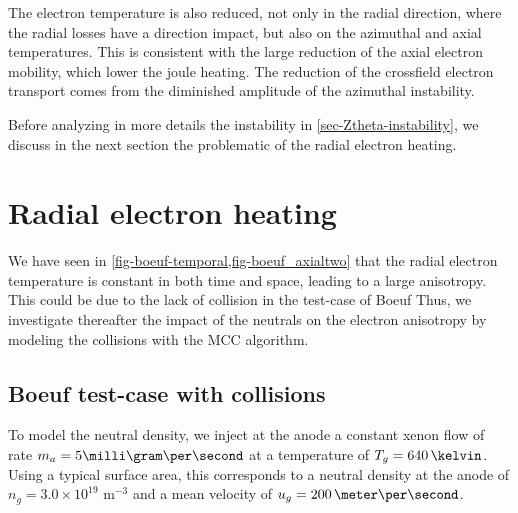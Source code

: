   The electron temperature is also reduced, not only in the radial direction, where the radial losses have a direction impact, but also on the azimuthal and axial temperatures.
  This is consistent with the large reduction of the axial electron mobility, which lower the joule heating.
  The reduction of the crossfield electron transport comes from the diminished amplitude of the azimuthal instability.
  
  Before analyzing in more details the instability in \cref{sec-Ztheta-instability}, we discuss in the next section the problematic of the radial electron heating.


  \section{Radial electron heating}
    We have seen in \cref{fig-boeuf-temporal,fig-boeuf_axialtwo} that the radial electron temperature is constant in both time and space, leading to a large anisotropy.
    This could be due to the lack of collision in the test-case of Boeuf
    Thus, we investigate thereafter the impact of the neutrals on the electron anisotropy by modeling the collisions with the \ac{MCC} algorithm.
    
  \subsection{Boeuf test-case with collisions} \label{subsec-MCC_boeuf}

  To model the neutral density, we inject at the anode a constant xenon flow of rate $m_a = 5 \milli\gram\per\second$ at a temperature of $T_g = 640\,\kelvin$.
  Using a typical surface area, this corresponds to a neutral density at the anode of $n_g=3.0 \times 10^{19}$ {m}$^{-3}$ and a mean velocity of $u_g = 200 \,\meter\per\second$.
  
